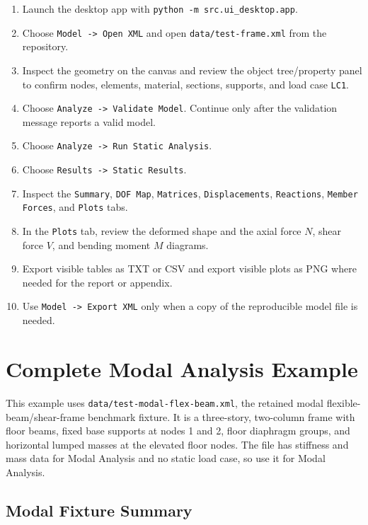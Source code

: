 \documentclass[11pt,a4paper]{article}
\begin{document}
\begin{enumerate}
\item Launch the desktop app with \texttt{python -m src.ui\_desktop.app}.
\item Choose \texttt{Model -> Open XML} and open \texttt{data/test-frame.xml} from the repository.
\item Inspect the geometry on the canvas and review the object tree/property panel to confirm nodes, elements, material, sections, supports, and load case \texttt{LC1}.
\item Choose \texttt{Analyze -> Validate Model}. Continue only after the validation message reports a valid model.
\item Choose \texttt{Analyze -> Run Static Analysis}.
\item Choose \texttt{Results -> Static Results}.
\item Inspect the \texttt{Summary}, \texttt{DOF Map}, \texttt{Matrices}, \texttt{Displacements}, \texttt{Reactions}, \texttt{Member Forces}, and \texttt{Plots} tabs.
\item In the \texttt{Plots} tab, review the deformed shape and the axial force \(N\), shear force \(V\), and bending moment \(M\) diagrams.
\item Export visible tables as TXT or CSV and export visible plots as PNG where needed for the report or appendix.
\item Use \texttt{Model -> Export XML} only when a copy of the reproducible model file is needed.
\end{enumerate}

\section{Complete Modal Analysis Example}

This example uses \texttt{data/test-modal-flex-beam.xml}, the retained modal flexible-beam/shear-frame benchmark fixture. It is a three-story, two-column frame with floor beams, fixed base supports at nodes 1 and 2, floor diaphragm groups, and horizontal lumped masses at the elevated floor nodes. The file has stiffness and mass data for Modal Analysis and no static load case, so use it for Modal Analysis.

\subsection{Modal Fixture Summary}
\end{document}
